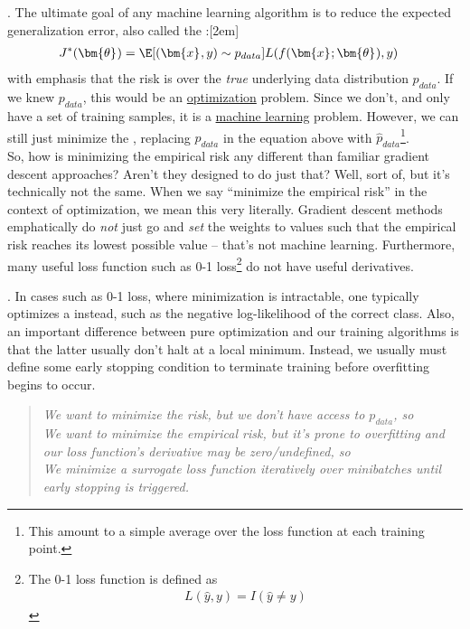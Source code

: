 \documentclass[11pt]{article}
\renewcommand\vec[2][]{\bm{#2}_{#1}}
\newcommand\myspace[1][]{\vspace{#1\bigskipamount}}
\newcommand\p{\Needspace{10\baselineskip} \noindent}
\begin{document}

. The ultimate goal of any machine learning algorithm is to reduce the expected generalization error, also called the :[2em]
\begin{align}
	J^*(\vec \theta) &= \E[(\vec x, y) \sim p_{data}]{ L(f(\vec x; \vec \theta), y)  }
\end{align}
with emphasis that the risk is over the \textit{true} underlying data distribution $p_{data}$. If we knew $p_{data}$, this would be an \underline{optimization} problem. Since we don't, and only have a set of training samples, it is a \underline{machine learning} problem. However, we can still just minimize the , replacing $p_{data}$ in the equation above with $\hat p_{data}$\footnote{This amount to a simple average over the loss function at each training point.}. \\

So, how is minimizing the empirical risk any different than familiar gradient descent approaches? Aren't they designed to do just that? Well, sort of, but it's technically not the same. When we say ``minimize the empirical risk'' in the context of optimization, we mean this very literally. Gradient descent methods emphatically do \textit{not} just go and \textit{set} the weights to values such that the empirical risk reaches its lowest possible value -- that's not machine learning. Furthermore, many useful loss function such as 0-1 loss\footnote{The 0-1 loss function is defined as
	\begin{align}
		L(\hat y, y) = I(\hat y \ne y)
	\end{align}
} do not have useful derivatives. 

\myspace
\p {}. In cases such as 0-1 loss, where minimization is intractable, one typically optimizes a  instead, such as the  negative log-likelihood of the correct class. Also, an important difference between pure optimization and our training algorithms is that the latter usually don't halt at a local minimum. Instead, we usually must define some early stopping condition to terminate training before overfitting begins to occur.  
\vspace{-0.5em}
\begin{quote}
	{\small\itshape
		We want to minimize the risk, but we don't have access to $p_{data}$, so \textellipsis \\
		We want to minimize the empirical risk, but it's prone to overfitting and our loss function's derivative may be zero/undefined, so \textellipsis \\
		We minimize a surrogate loss function iteratively over minibatches until early stopping is triggered.
	}
\end{quote}
\end{document}
